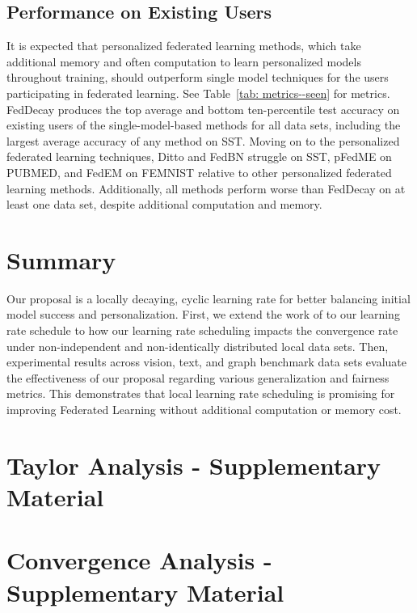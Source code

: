 \documentclass{article}
\begin{document}
\subsection{Performance on Existing Users}
\label{sec: seen}

It is expected that personalized federated learning methods, which take additional memory and often computation to learn personalized models throughout training, should outperform single model techniques for the users participating in federated learning. 
See Table~\ref{tab: metrics--seen} for metrics.
FedDecay produces the top average and bottom ten-percentile test accuracy on existing users of the single-model-based methods for all data sets, including the largest average accuracy of any method on SST.
Moving on to the personalized federated learning techniques, Ditto and FedBN struggle on SST, pFedME on PUBMED, and FedEM on FEMNIST relative to other personalized federated learning methods.
Additionally, all methods perform worse than FedDecay on at least one data set, despite additional computation and memory.



%
\section{Summary}

Our proposal is a locally decaying, cyclic learning rate for better balancing initial model success and personalization.
First, we extend the work of \cite{fedavg-conv} to our learning rate schedule to how our learning rate scheduling impacts the convergence rate under non-independent and non-identically distributed local data sets.
Then, experimental results across vision, text, and graph benchmark data sets evaluate the effectiveness of our proposal regarding various generalization and fairness metrics.
This demonstrates that local learning rate scheduling is promising for improving Federated Learning without additional computation or memory cost. 


%
{  
    \small 
    
    
}


%
\clearpage
\appendix
\section{Taylor Analysis - Supplementary Material}
\label{pf: taylor}


\clearpage
\section{Convergence Analysis - Supplementary Material}

\end{document}
